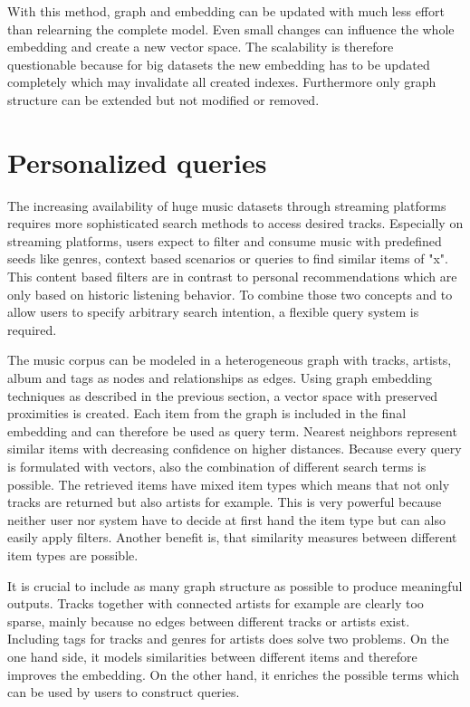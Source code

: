 \documentclass[sigconf]{acmart}
\begin{document}
With this method, graph and embedding can be updated with much less effort than relearning the complete model. Even small changes can influence the whole embedding and create a new vector space. The scalability is therefore questionable because for big datasets the new embedding has to be updated completely which may invalidate all created indexes. Furthermore only graph structure can be extended but not modified or removed.


\section{Personalized queries}
The increasing availability of huge music datasets through streaming platforms requires more sophisticated search methods to access desired tracks. Especially on streaming platforms, users expect to filter and consume music with predefined seeds like genres, context based scenarios or queries to find similar items of "x". This content based filters are in contrast to personal recommendations which are only based on historic listening behavior. To combine those two concepts and to allow users to specify arbitrary search intention, a flexible query system is required.

The music corpus can be modeled in a heterogeneous graph with tracks, artists, album and tags as nodes and relationships as edges. Using graph embedding techniques as described in the previous section, a vector space with preserved proximities is created. Each item from the graph is included in the final embedding and can therefore be used as query term. Nearest neighbors represent similar items with decreasing confidence on higher distances. Because every query is formulated with vectors, also the combination of different search terms is possible. The retrieved items have mixed item types which means that not only tracks are returned but also artists for example. This is very powerful because neither user nor system have to decide at first hand the item type but can also easily apply filters. Another benefit is, that similarity measures between different item types are possible.

It is crucial to include as many graph structure as possible to produce meaningful outputs. Tracks together with connected artists for example are clearly too sparse, mainly because no edges between different tracks or artists exist. Including tags for tracks and genres for artists does solve two problems. On the one hand side, it models similarities between different items and therefore improves the embedding. On the other hand, it enriches the possible terms which can be used by users to construct queries. \\
\end{document}
